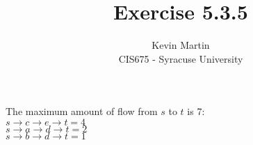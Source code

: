 \documentclass{article}
\author{Kevin Martin\\ CIS675 - Syracuse University}
\title{Exercise 5.3.5}
\begin{document}
\maketitle
The maximum amount of flow from $s$ to $t$ is 7:\\
$s \to c \to e \to t = 4$\\
$s \to a \to d \to t = 2$\\
$s \to b \to d \to t = 1$
\end{document}
